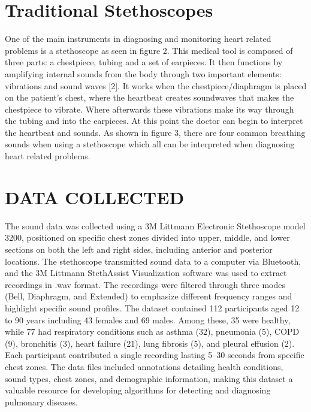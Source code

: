 \documentclass[twocolumn]{article}
\begin{document}
\section{Traditional Stethoscopes} 
One of the main instruments in diagnosing and monitoring heart related problems is a stethoscope as 
seen in figure 2. This medical tool is composed of three parts: a chestpiece, tubing and 
a set of earpieces. It then functions by amplifying internal sounds from the body through two 
important elements: vibrations and sound waves [2]. It works when the chestpiece/diaphragm is placed on the 
patient’s chest, where the heartbeat creates soundwaves that makes the chestpiece to vibrate. Where afterwards these 
vibrations make its way through the tubing and into the earpieces. At this point the doctor 
can begin to interpret the heartbeat and sounds. As shown in figure 3, there are four 
common breathing sounds when using a stethoscope which all can be interpreted when diagnosing heart related problems. 

\section{DATA COLLECTED}  
The sound data was collected using a 3M Littmann Electronic Stethoscope model 3200, positioned on specific chest zones divided into upper, middle, and lower sections on both the left and right sides, including anterior and posterior locations. The stethoscope transmitted sound data to a computer via Bluetooth, and the 3M Littmann  StethAssist Visualization software was used to extract recordings in .wav format. The recordings were filtered through three modes (Bell, Diaphragm, and Extended) to emphasize different frequency ranges and highlight specific sound profiles.
The dataset contained 112 participants aged 12 to 90 years including 43 females and 69 males. Among these, 35 were healthy, while 77 had respiratory conditions such as asthma (32), pneumonia (5), COPD (9), bronchitis (3), heart failure (21), lung fibrosis (5), and pleural effusion (2). Each participant contributed a single recording lasting 5–30 seconds from specific chest zones. The data files included annotations detailing health conditions, sound types, chest zones, and demographic information, making this dataset a valuable resource for developing algorithms for detecting and diagnosing pulmonary diseases.


\cite{heart}
\cite{telehealth}




\appendix
\end{document}
